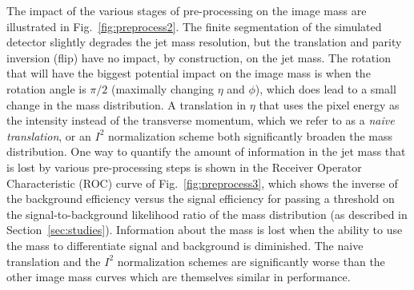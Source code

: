 The impact of the various stages of pre-processing on the image mass are illustrated in Fig.~\ref{fig:preprocess2}.  The finite segmentation of the simulated detector slightly degrades the jet mass resolution, but the translation and parity inversion (flip) have no impact, by construction, on the jet mass.  The rotation that will have the biggest potential impact on the image mass is when the rotation angle is $\pi/2$ (maximally changing $\eta$ and $\phi$), which does lead to a small change in the mass distribution.  A translation in $\eta$ that uses the pixel energy as the intensity instead of the transverse momentum, which we refer to as a \textit{naive translation}, or an $I^2$ normalization scheme both significantly broaden the mass distribution.  One way to quantify the amount of information in the jet mass that is lost by various pre-processing steps is shown in the Receiver Operator Characteristic (ROC) curve of Fig.~\ref{fig:preprocess3}, which shows the inverse of the background efficiency versus the signal efficiency for passing a threshold on the signal-to-background likelihood ratio of the mass distribution (as described in Section~\ref{sec:studies}).  Information about the mass is lost when the ability to use the mass to differentiate signal and background is diminished.  The naive translation and the $I^2$ normalization schemes are significantly worse than the other image mass curves which are themselves similar in performance. 

